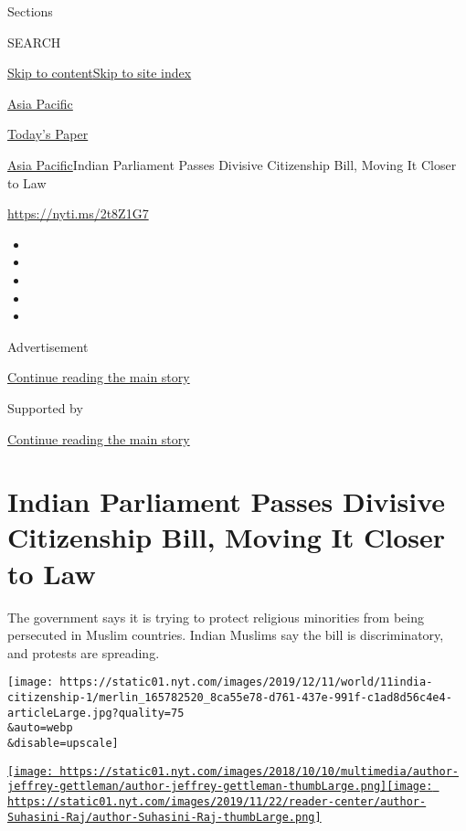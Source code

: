 Sections

SEARCH

\protect\hyperlink{site-content}{Skip to
content}\protect\hyperlink{site-index}{Skip to site index}

\href{https://www.nytimes.com/section/world/asia}{Asia Pacific}

\href{https://myaccount.nytimes.com/auth/login?response_type=cookie\&client_id=vi}{}

\href{https://www.nytimes.com/section/todayspaper}{Today's Paper}

\href{/section/world/asia}{Asia Pacific}\textbar{}Indian Parliament
Passes Divisive Citizenship Bill, Moving It Closer to Law

\url{https://nyti.ms/2t8Z1G7}

\begin{itemize}
\item
\item
\item
\item
\item
\end{itemize}

Advertisement

\protect\hyperlink{after-top}{Continue reading the main story}

Supported by

\protect\hyperlink{after-sponsor}{Continue reading the main story}

\hypertarget{indian-parliament-passes-divisive-citizenship-bill-moving-it-closer-to-law}{%
\section{Indian Parliament Passes Divisive Citizenship Bill, Moving It
Closer to
Law}\label{indian-parliament-passes-divisive-citizenship-bill-moving-it-closer-to-law}}

The government says it is trying to protect religious minorities from
being persecuted in Muslim countries. Indian Muslims say the bill is
discriminatory, and protests are spreading.

\texttt{[image: https://static01.nyt.com/images/2019/12/11/world/11india-citizenship-1/merlin\_165782520\_8ca55e78-d761-437e-991f-c1ad8d56c4e4-articleLarge.jpg?quality=75\\\&auto=webp\\\&disable=upscale]}

\href{https://www.nytimes.com/by/jeffrey-gettleman}{\texttt{[image: https://static01.nyt.com/images/2018/10/10/multimedia/author-jeffrey-gettleman/author-jeffrey-gettleman-thumbLarge.png]}}\href{https://www.nytimes.com/by/suhasini-raj}{\texttt{[image: https://static01.nyt.com/images/2019/11/22/reader-center/author-Suhasini-Raj/author-Suhasini-Raj-thumbLarge.png]}}


